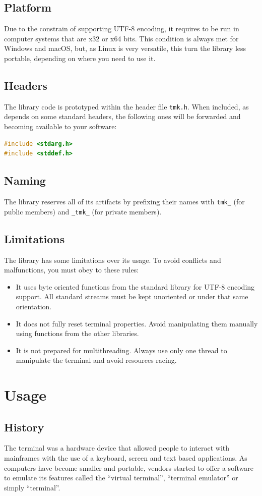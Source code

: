 \documentclass{report}
\begin{document}
\section{Platform}
Due to the constrain of supporting UTF-8 encoding, it requires to be run in computer systems that are x32 or x64 bits. This condition is always met for Windows and macOS, but, as Linux is very versatile, this turn the library less portable, depending on where you need to use it.
\section{Headers}
The library code is prototyped within the header file \texttt{tmk.h}. When included, as depends on some standard headers, the following ones will be forwarded and becoming available to your software:
\begin{lstlisting}[language=c,caption=the headers forwarded by the library.]
#include <stdarg.h>
#include <stddef.h>
\end{lstlisting}
\section{Naming}
The library reserves all of its artifacts by prefixing their names with \texttt{tmk\_} (for public members) and \texttt{\_tmk\_} (for private members).
\section{Limitations}
The library has some limitations over its usage. To avoid conflicts and malfunctions, you must obey to these rules:
\begin{itemize}
  \item  It uses byte oriented functions from the standard library for UTF-8 encoding support. All standard streams must be kept unoriented or under that same orientation.
  \item It does not fully reset terminal properties. Avoid manipulating them manually using functions from the other libraries.
  \item It is not prepared for multithreading. Always use only one thread to manipulate the terminal and avoid resources racing.
\end{itemize}
\chapter{Usage}
\section{History}
The terminal was a hardware device that allowed people to interact with mainframes with the use of a keyboard, screen and text based applications. As computers have become smaller and portable, vendors started to offer a software to emulate its features called the ``virtual terminal'', ``terminal emulator'' or simply ``terminal''.
\end{document}
